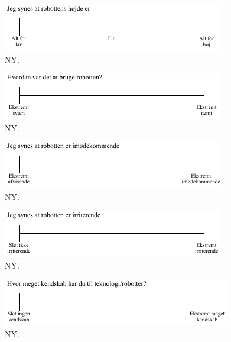 %
\begin{figure}[H]
\centering
\includegraphics[width =\textwidth]{Figure/UdvalgteSkalaer/HoejdeR} 
\caption{NY.}
\label{fig:SkalaHoejdeR}
\end{figure}
\noindent
%

%
\begin{figure}[H]
\centering
\includegraphics[width =\textwidth]{Figure/UdvalgteSkalaer/HvordanVarDetAtBrugeR} 
\caption{NY.}
\label{fig:SkalaHvordanVarDetAtBrugeR}
\end{figure}
\noindent
%

%
\begin{figure}[H]
\centering
\includegraphics[width =\textwidth]{Figure/UdvalgteSkalaer/Imoedekommende} 
\caption{NY.}
\label{fig:SkalaImoedekommende}
\end{figure}
\noindent
%

%
\begin{figure}[H]
\centering
\includegraphics[width =\textwidth]{Figure/UdvalgteSkalaer/Irriterende} 
\caption{NY.}
\label{fig:SkalaIrriterende}
\end{figure}
\noindent
%

%
\begin{figure}[H]
\centering
\includegraphics[width =\textwidth]{Figure/UdvalgteSkalaer/KendskabTilTeknologi} 
\caption{NY.}
\label{fig:SkalaKendskabTilTeknologi}
\end{figure}
\noindent
%

